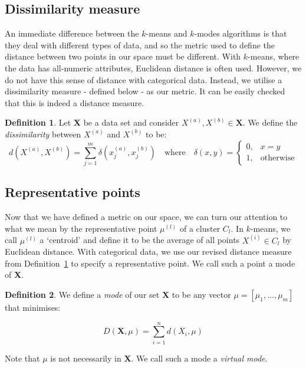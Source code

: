 \documentclass{article}
\theoremstyle{definition}
\newtheorem{definition}{Definition}[section]
\begin{document}
\subsection{Dissimilarity measure}\label{subsection:dissim}

An immediate difference between the \(k\)-means and \(k\)-modes algorithms is 
that they deal with different types of data, and so the metric used to define 
the distance between two points in our space must be different. With 
\(k\)-means, where the data has all-numeric attributes, Euclidean distance is 
often used. However, we do not have this sense of distance with categorical 
data. Instead, we utilise a dissimilarity measure - defined below - as our 
metric. It can be easily checked that this is indeed a distance measure.\\

\begin{definition}\label{def:dissim}
	Let $\textbf{X}$ be a data set and consider $X^{(a)}, X^{(b)} \in 
    \textbf{X}$. We define the \emph{dissimilarity} between $X^{(a)}$ and 
    $X^{(b)}$ to be:
	\[
	d(X^{(a)}, X^{(b)}) = \sum_{j=1}^{m} \delta(x_j^{(a)}, x_j^{(b)}) \quad
	\text{where} \quad \delta(x, y) = \begin{cases}
                                        0, & x = y \\
					                    1, & \text{otherwise}
					                \end{cases}
	\]
\end{definition}


\subsection{Representative points}\label{subsection:rep-points}

Now that we have defined a metric on our space, we can turn our attention to 
what we mean by the representative point \(\mu^{(l)}\) of a cluster \(C_l\). In 
\(k\)-means, we call \(\mu^{(l)}\) a `centroid' and define it to be the average 
of all points \(X^{(i)} \in C_l\) by Euclidean distance. With categorical data, 
we use our revised distance measure from Definition~\ref{def:dissim} to specify 
a representative point. We call such a point a mode of \textbf{X}.\\

\begin{definition}\label{def:mode}
    We define a \emph{mode} of our set \textbf{X} to be any vector \(\mu = 
    [\mu_1, \ldots, \mu_m]\) that minimises:
	
    \begin{equation}
		D(\textbf{X}, \mu) = \sum_{i=1}^{n} d(X_i, \mu)
	\end{equation}
	
    Note that \(\mu\) is not necessarily in \textbf{X}. We call such a mode a 
    \emph{virtual mode}.
\end{definition}
\end{document}

